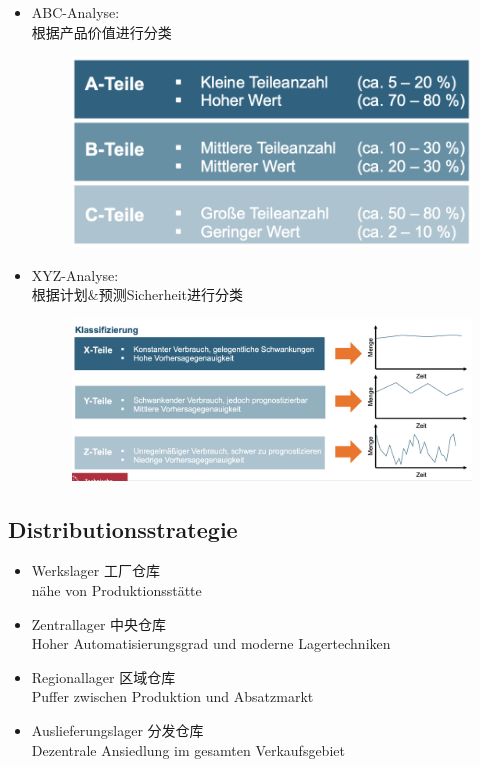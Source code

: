 \documentclass[12pt, letterpaper]{article}
\begin{document}
\begin{CJK*}{UTF8}{gbsn}
\begin{itemize}
\newpage
\item ABC-Analyse:\\
根据产品价值进行分类\\
\begin{figure}[h!]
  \centering %
  \includegraphics[width=0.4\linewidth]{VL35.png}\\
\end{figure}

\item XYZ-Analyse:\\
根据计划\&预测Sicherheit进行分类
\begin{figure}[h!]
  \centering %
  \includegraphics[width=0.6\linewidth]{VL36.png}\\
\end{figure}

\end{itemize}

\subsection{Distributionsstrategie}
\begin{itemize}
\item Werkslager 工厂仓库\\ 
nähe von Produktionsstätte

\item Zentrallager 中央仓库\\
Hoher Automatisierungsgrad und moderne Lagertechniken

\item Regionallager 区域仓库\\
Puffer zwischen Produktion und Absatzmarkt

\item Auslieferungslager 分发仓库\\
Dezentrale Ansiedlung im gesamten Verkaufsgebiet\\


\end{itemize}
\end{CJK*}
\end{document}
